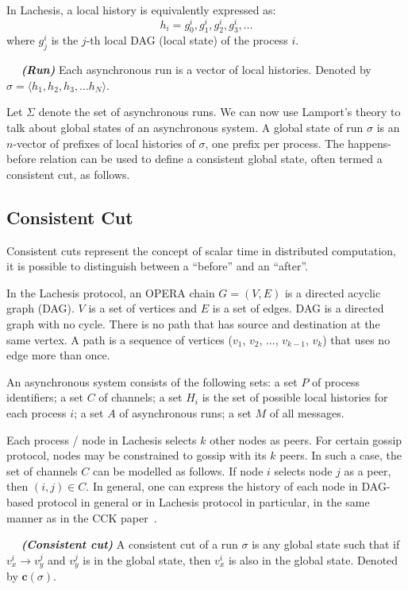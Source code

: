 \documentclass{article}
\newcommand{\dfnn}[2]{$\quad$ \textbf{\emph{(#1)}} {#2}}
\renewcommand{\vec}[1]{\mathbf{#1}}
\begin{document}
In Lachesis, a local history is equivalently expressed as:
$$h_i = g_0^i, g_1^i, g_2^i, g_3^i, \dots$$
where $g_j^i$ is the $j$-th local DAG (local state) of the process $i$.

\dfnn{Run}{Each asynchronous run is a vector of local histories. Denoted by
	$\sigma = \langle h_1,h_2,h_3,...h_N \rangle$.}

Let $\Sigma$ denote the set of asynchronous runs. We can now use Lamport’s theory to talk about global states of an asynchronous system. A global state of run $\sigma$ is an $n$-vector of prefixes of local histories of $\sigma$, one prefix per process. The happens-before relation can be used to define a consistent global state, often termed a consistent cut, as follows.

\subsection{Consistent Cut} 

Consistent cuts represent the concept of scalar time in distributed computation, it is possible to distinguish between a ``before'' and an ``after''.

In the Lachesis protocol, an OPERA chain $G=(V,E)$ is a directed acyclic graph (DAG). $V$ is a set of vertices and $E$ is a set of edges. DAG is a directed graph with no cycle. There is no path that has source and destination at the same vertex.
A path is a sequence of vertices ($v_1$, $v_2$, ..., $v_{k-1}$, $v_k$) that uses no edge more than once. 

An asynchronous system consists of the following sets: a set $P$ of process identifiers; a set $C$ of channels; a set $H_i$ is the set of possible local histories for each process $i$; a set $A$ of asynchronous runs; a set $M$ of all messages.

Each process / node in Lachesis selects $k$ other nodes as peers. 
For certain gossip protocol, nodes may be constrained to gossip with its $k$ peers. In such a case, the set of channels $C$ can be modelled as follows.
If node $i$ selects node $j$ as a peer, then $(i,j) \in C$. In general, one can express the history of each node in DAG-based protocol in general or in Lachesis protocol in particular, in the same manner as in the CCK paper~\cite{cck92}.


\dfnn{Consistent cut}{A consistent cut of a run $\sigma$ is any global state such that if $v_x^i \rightarrow v_y^j$ and $v_y^j$ is in the global state, then $v_x^i$ is also in the global state. Denoted by $\vec{c}(\sigma)$.}
\end{document}
